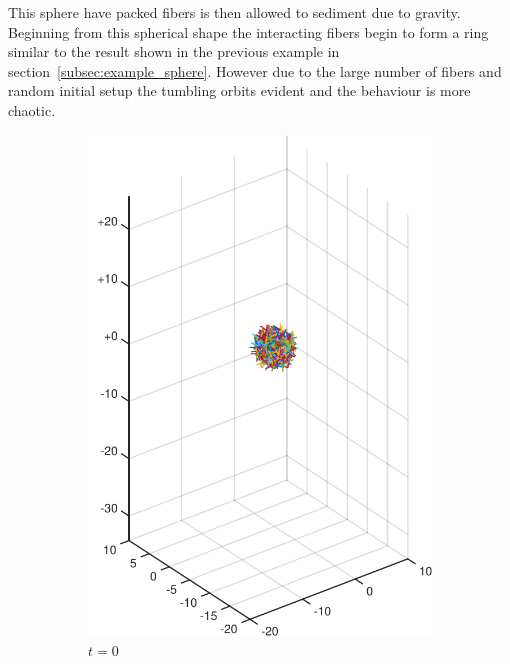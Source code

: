 \documentclass[a4paper,11pt]{kth-mag}
\begin{document}
This sphere have packed fibers is then allowed to sediment due to gravity. Beginning from this spherical shape the interacting fibers begin to form a ring similar to the result shown in the previous example in section~\ref{subsec:example_sphere}. However due to the large number of fibers and random initial setup the tumbling orbits evident and the behaviour is more chaotic.

\begin{figure}
  \centering
  \begin{subfigure}[h]{0.4\textwidth}
    \centering
    \includegraphics[width=\textwidth]{img/sphere_00000.pdf}
    \caption{$t=0$}\label{fig:sphere_simulation_1a}
  \end{subfigure}
  \begin{subfigure}[h]{0.4\textwidth}
    \centering

\end{subfigure}
\end{figure}
\end{document}
